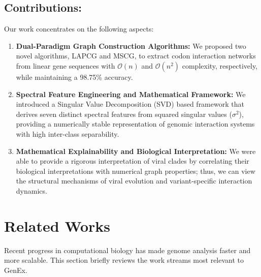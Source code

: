 \documentclass[conference]{IEEEtran}
\begin{document}
\subsection{Contributions:}
Our work concentrates on the following aspects:
\begin{enumerate}
    \item \textbf{Dual-Paradigm Graph Construction Algorithms:}
    We proposed two novel algorithms, LAPCG and MSCG, to extract codon interaction networks from linear gene sequences with $\mathcal{O}(n)$ and $\mathcal{O}(n^2)$ complexity, respectively, while maintaining a 98.75\% accuracy.
    
    \item \textbf{Spectral Feature Engineering and Mathematical Framework:}
    We introduced a Singular Value Decomposition (SVD) based framework that derives seven distinct spectral features from squared singular values ($\sigma^2$), providing a numerically stable representation of genomic interaction systems with high inter-class separability.

    \item \textbf{Mathematical Explainability and Biological Interpretation:}
    We were able to provide a rigorous interpretation of viral clades by correlating their biological interpretations with numerical graph properties; thus, we can view the structural mechanisms of viral evolution and variant-specific interaction dynamics.
\end{enumerate}

\section{Related Works}

Recent progress in computational biology has made genome analysis faster and more scalable. This section briefly reviews the work streams most relevant to GenEx.
\end{document}
